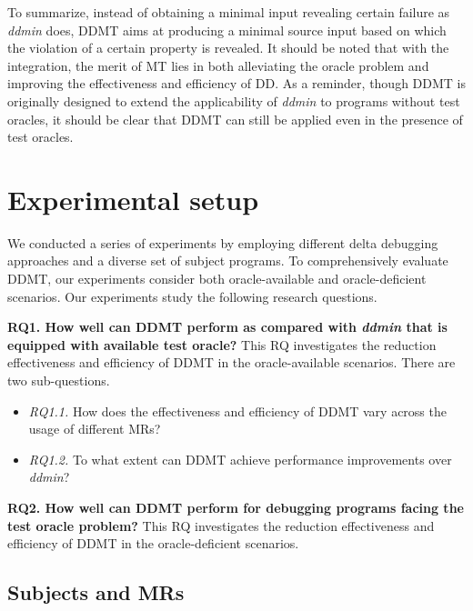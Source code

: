 	




To summarize, instead of obtaining a minimal input revealing certain failure as \emph{ddmin} does, DDMT aims at producing a minimal source input based on which the violation of a certain property is revealed.
It should be noted that with the integration, the merit of MT lies in both alleviating the oracle problem and improving the effectiveness and efficiency of DD.
As a reminder, though DDMT is originally designed to extend the applicability of \emph{ddmin} to programs without test oracles, it should be clear that DDMT can still be applied even in the presence of test oracles.


\section{Experimental setup}
\label{sec:setup}

We conducted a series of experiments by employing different delta debugging approaches and a diverse set of subject programs.
To comprehensively evaluate DDMT, our experiments consider both oracle-available and oracle-deficient scenarios.
Our experiments study the following research questions.

\noindent 
\textbf{RQ1. How well can DDMT perform as compared with \emph{ddmin} that is equipped with available test oracle?}
This RQ investigates the reduction effectiveness and efficiency of DDMT in the oracle-available scenarios.
There are two sub-questions.

\begin{itemize}
\item \emph{RQ1.1.} How does the effectiveness and efficiency of DDMT vary across the usage of different MRs?

\item \emph{RQ1.2.} To what extent can DDMT achieve performance improvements over \emph{ddmin}?
\end{itemize}

\noindent 
\textbf{RQ2. How well can DDMT perform for debugging programs facing the test oracle problem?}
This RQ investigates the reduction effectiveness and efficiency of DDMT in the oracle-deficient scenarios.


\subsection{Subjects and MRs}
\label{sec:prog}



